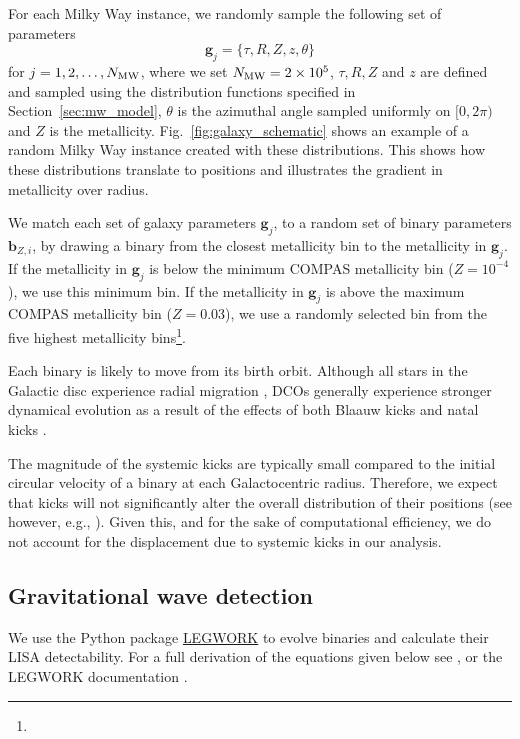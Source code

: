 For each Milky Way instance, we randomly sample the following set of parameters
\begin{equation}
    \mathbf{g}_{{j}} = \{\tau, R, Z, z, \theta\}
\end{equation}
for $j = 1, 2, \dots, N_{\rm MW}$, where we set $N_{\rm MW} = 2 \times 10^{5}$, $\tau, R, Z$ and $z$ are defined and sampled using the distribution functions specified in Section~\ref{sec:mw_model}, $\theta$ is the azimuthal angle sampled uniformly on $[0, 2\pi)$ and $Z$ is the metallicity. Fig.~\ref{fig:galaxy_schematic} shows an example of a random Milky Way instance created with these distributions. This shows how these distributions translate to positions and illustrates the gradient in metallicity over radius.

We match each set of galaxy parameters $\mathbf{g}_{{j}}$, to a random set of binary parameters $\mathbf{b}_{{Z, i}}$, by drawing a binary from the closest metallicity bin to the metallicity in $\mathbf{g}_{{j}}$. If the metallicity in $\mathbf{g}_{{j}}$ is below the minimum COMPAS metallicity bin ($Z = 10^{-4}$), we use this minimum bin. If the metallicity in $\mathbf{g}_{{j}}$ is above the maximum COMPAS metallicity bin ($Z = 0.03$), we use a randomly selected bin from the five highest metallicity bins\footnote{}.

Each binary is likely to move from its birth orbit. Although all stars in the Galactic disc experience radial migration \citep{Sellwood+2002, Frankel+2018}, DCOs generally experience stronger dynamical evolution as a result of the effects of both Blaauw kicks \citep{Blaauw+1961} and natal kicks \citep[e.g.][]{Hobbs+2005}.

The magnitude of the systemic kicks are typically small compared to the initial circular velocity of a binary at each Galactocentric radius. Therefore, we expect that kicks will not significantly alter the overall distribution of their positions (see however, e.g., \citealt{Brandt+1995, Abbott+2017_GW170817_progenitor}). Given this, and for the sake of computational efficiency, we do not account for the displacement due to systemic kicks in our analysis.

\subsection{Gravitational wave detection}\label{sec:gw_detection}
We use the Python package \href{https://legwork.readthedocs.io/en/latest/}{LEGWORK} \citep{Wagg+2021} to evolve binaries and calculate their LISA detectability. For a full derivation of the equations given below see \citep[][Section~3]{Wagg+2021}, or the LEGWORK documentation \href{https://legwork.readthedocs.io/en/latest/notebooks/Derivations.html}{\faBook}.


